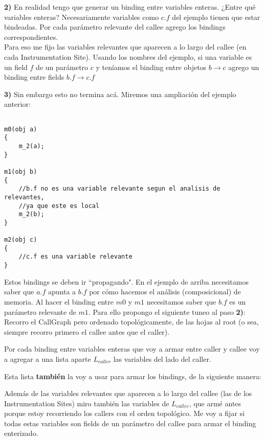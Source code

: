 \documentclass[10pt,a4paper,final]{report}
\begin{document}
\textbf{2)} En realidad tengo que generar un binding entre variables enteras. ¿Entre qué variables enteras? Necesariamente variables como $c.f$ del ejemplo tienen que estar bindeadas. Por cada parámetro relevante del callee agrego los bindings correspondientes. \\

Para eso me fijo las variables relevantes que aparecen a lo largo del callee (en cada Instrumentation Site). Usando los nombres del ejemplo, si una variable es un field $f$ de un parámetro $c$ y teníamos el binding entre objetos $b\rightarrow c$ agrego un binding entre fields $b.f \rightarrow c.f$ \bigskip

\textbf{3)} Sin embargo esto no termina acá. Miremos una ampliación del ejemplo anterior:

\begin{lstlisting}

m0(obj a)
{
	m_2(a);
}

m1(obj b)
{
	//b.f no es una variable relevante segun el analisis de relevantes,
	//ya que este es local
	m_2(b);
}

m2(obj c)
{
	//c.f es una variable relevante
}

\end{lstlisting}


Estos bindings se deben ir ``propagando". En el ejemplo de arriba necesitamos saber que $a.f$ apunta a $b.f$ por cómo hacemos el análisis (composicional) de memoria. Al hacer el binding entre $m0$ y $m1$ necesitamos saber que $b.f$ es un parámetro relevante de $m1$. Para ello propongo el siguiente tuneo al paso \textbf{2)}:\\

Recorro el CallGraph pero ordenado topológicamente, de las hojas al root (o sea, siempre recorro primero el callee antes que el caller).

Por cada binding entre variables enteras que voy a armar entre caller y callee voy a agregar a una lista aparte $L_{caller}$ las variables del lado del caller.

Esta lista \textbf{también} la voy a usar para armar los bindings, de la siguiente manera: 

Además de las variables relevantes que aparecen a lo largo del callee (las de los Instrumentation Sites) miro también las variables de $L_{callee}$, que armé antes porque estoy recorriendo los callers con el orden topológico. Me voy a fijar si todas estas variables son fields de un parámetro del callee para armar el binding enterizado.
\end{document}
